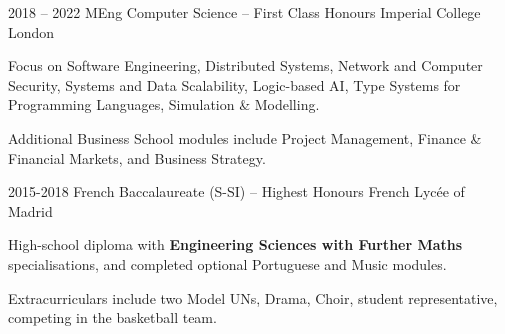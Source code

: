\begin{entrylist}
    \entry
    {2018 -- 2022}
    {MEng Computer Science -- First Class Honours}
    {Imperial College London}
    {
        Focus on Software Engineering,
        Distributed Systems,
        Network and Computer Security,
        Systems and Data Scalability,
        Logic-based AI,
        Type Systems for Programming Languages,
        Simulation \& Modelling.

        \para
        Additional Business School modules include Project Management, Finance \& Financial Markets, and
        Business Strategy.
    }
    \entry
    {2015-2018}
    {French Baccalaureate (S-SI) -- Highest Honours}
    {French Lycée of Madrid}
    {
        High-school diploma with \textbf{Engineering Sciences with Further Maths} specialisations,
        and completed optional Portuguese and Music modules.

        \para
        Extracurriculars include two Model UNs, Drama, Choir, student representative, competing in
    the basketball team.
    }
\end{entrylist}
